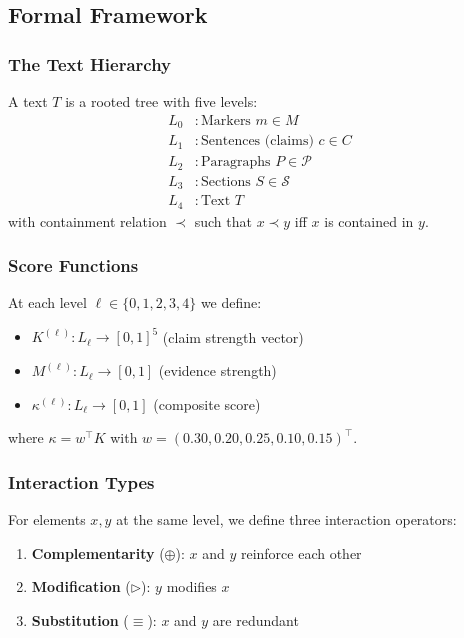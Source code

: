 \subsection{Formal Framework}

\subsubsection{The Text Hierarchy}

\begin{termbox}
A text $T$ is a rooted tree with five levels:
\begin{align*}
L_0 &: \text{Markers } m \in M \\
L_1 &: \text{Sentences (claims) } c \in C \\
L_2 &: \text{Paragraphs } P \in \mathcal{P} \\
L_3 &: \text{Sections } S \in \mathcal{S} \\
L_4 &: \text{Text } T
\end{align*}
with containment relation $\prec$ such that $x \prec y$ iff $x$ is contained in $y$.
\end{termbox}

\subsubsection{Score Functions}

At each level $\ell \in \{0,1,2,3,4\}$ we define:
\begin{itemize}
    \item $K^{(\ell)} : L_\ell \rightarrow [0,1]^5$ \quad (claim strength vector)
    \item $M^{(\ell)} : L_\ell \rightarrow [0,1]$ \quad (evidence strength)
    \item $\kappa^{(\ell)} : L_\ell \rightarrow [0,1]$ \quad (composite score)
\end{itemize}
where $\kappa = w^\top K$ with $w = (0.30, 0.20, 0.25, 0.10, 0.15)^\top$.

\subsubsection{Interaction Types}

For elements $x,y$ at the same level, we define three interaction operators:
\begin{enumerate}
    \item \textbf{Complementarity} ($\oplus$): $x$ and $y$ reinforce each other
    \item \textbf{Modification} ($\triangleright$): $y$ modifies $x$
    \item \textbf{Substitution} ($\equiv$): $x$ and $y$ are redundant
\end{enumerate}

